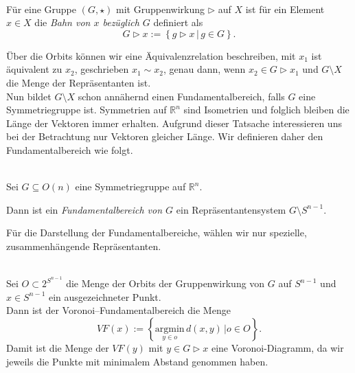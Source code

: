 \begin{definition}[Orbit] \label{fundamentalbereich:orbit} \mbox{}\\
  Für eine Gruppe $(G, \star)$ mit Gruppenwirkung $\rhd$ auf $X$ ist für ein Element $x \in X$ die \emph{Bahn von $x$ bezüglich $G$} definiert als
   $$
      G \rhd x := \left\{ g \rhd x \, | \, g \in G \right\}.
   $$
\end{definition}

Über die Orbits können wir eine Äquivalenzrelation beschreiben, mit $x_1$ ist äquivalent zu $x_2$, geschrieben $x_1 \sim x_2$, genau dann, wenn $x_2 \in G \rhd x_1$ und $G \setminus X$ die Menge der Repräsentanten ist.\\

Nun bildet $G \setminus X$ schon annähernd einen Fundamentalbereich, falls $G$ eine Symmetriegruppe ist. Symmetrien auf $\mathbb{R}^n$ sind Isometrien und folglich bleiben die Länge der Vektoren immer erhalten. Aufgrund dieser Tatsache interessieren uns bei der Betrachtung nur Vektoren gleicher Länge. Wir definieren daher den Fundamentalbereich wie folgt.\\

\begin{definition}[Fundamentalbereich]\label{fundamentalbereich:def} \mbox{}\\
   Sei $G \subseteq O(n)$ eine Symmetriegruppe auf $\mathbb{R}^n$.

   \noindent Dann ist ein \emph{Fundamentalbereich von $G$} ein Repräsentantensystem $G \setminus S^{n-1}$.
\end{definition} 

Für die Darstellung der Fundamentalbereiche, wählen wir nur spezielle, zusammenhängende Repräsentanten.

\begin{definition}\label{fundamentalbereich:voronoi} \mbox{}\\
   Sei $O \subset 2^{S^{n-1}}$ die Menge der Orbits der Gruppenwirkung von $G$ auf $S^{n-1}$ und $x \in S^{n-1}$ ein ausgezeichneter Punkt.\\

   Dann ist der Voronoi--Fundamentalbereich die Menge
   $$
      VF(x) := \left\{ \underset{y\in o}{\text{argmin}} \, d(x,y) \, |  o \in O\right\}.
   $$
   Damit ist die Menge der $VF(y)$ mit $y \in G \rhd x$ eine Voronoi-Diagramm, da wir jeweils die Punkte mit minimalem Abstand genommen haben.
\end{definition}


